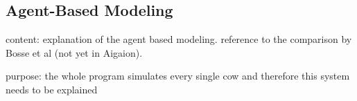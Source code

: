 \subsection{Agent-Based Modeling}
content: explanation of the agent based modeling. reference to the comparison by Bosse et al (not yet in Aigaion).

purpose: the whole program simulates every single cow and therefore this system needs to be explained 